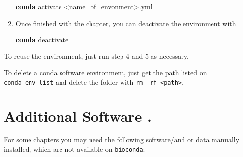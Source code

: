 \documentclass[
  letterpaper,
]{book}
\newenvironment{Shaded}{}{}
\newcommand{\ExtensionTok}[1]{\textcolor[rgb]{0.84,0.23,0.29}{\textbf{#1}}}
\newcommand{\NormalTok}[1]{\textcolor[rgb]{0.14,0.16,0.18}{#1}}
\newcommand{\OperatorTok}[1]{\textcolor[rgb]{0.14,0.16,0.18}{#1}}
\begin{document}
\begin{enumerate}
\begin{Shaded}
\begin{Highlighting}[]
\ExtensionTok{conda}\NormalTok{ activate }\OperatorTok{\textless{}}\NormalTok{name\_of\_envonment}\OperatorTok{\textgreater{}}\NormalTok{.yml}
\end{Highlighting}
\end{Shaded}
\item
  Once finished with the chapter, you can deactivate the environment
  with

\begin{Shaded}
\begin{Highlighting}[]
\ExtensionTok{conda}\NormalTok{ deactivate}
\end{Highlighting}
\end{Shaded}
\end{enumerate}

To reuse the environment, just run step 4 and 5 as necessary.

\begin{tcolorbox}[enhanced jigsaw, opacitybacktitle=0.6, bottomtitle=1mm, opacityback=0, colback=white, coltitle=black, leftrule=.75mm, toprule=.15mm, title=\textcolor{quarto-callout-tip-color}{\faLightbulb}\hspace{0.5em}{Tip}, colframe=quarto-callout-tip-color-frame, toptitle=1mm, arc=.35mm, left=2mm, titlerule=0mm, breakable, rightrule=.15mm, bottomrule=.15mm, colbacktitle=quarto-callout-tip-color!10!white]

To delete a conda software environment, just get the path listed on
\texttt{conda\ env\ list} and delete the folder with
\texttt{rm\ -rf\ \textless{}path\textgreater{}}.

\end{tcolorbox}

\hypertarget{additional-software-.}{%
\section*{Additional Software .}\label{additional-software-.}}


For some chapters you may need the following software/and or data
manually installed, which are not available on \texttt{bioconda}:
\end{document}
